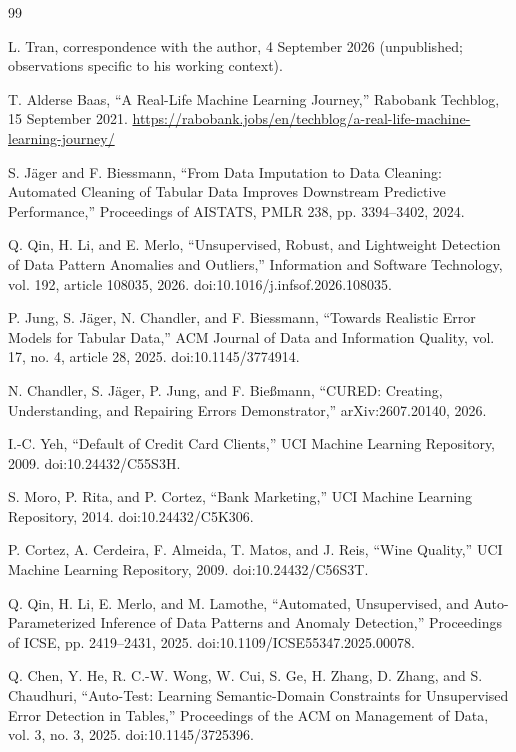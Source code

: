 \documentclass[11pt,a4paper]{article}
\begin{document}
\begin{thebibliography}{99}
\small
\setlength{\itemsep}{2pt}
\setlength{\parskip}{0pt}

 L. Tran, correspondence with the author, 4 September 2026 (unpublished; observations specific to his working context).

 T. Alderse Baas, ``A Real-Life Machine Learning Journey,'' Rabobank Techblog, 15 September 2021. \url{https://rabobank.jobs/en/techblog/a-real-life-machine-learning-journey/}

 S. J\"ager and F. Biessmann, ``From Data Imputation to Data Cleaning: Automated Cleaning of Tabular Data Improves Downstream Predictive Performance,'' Proceedings of AISTATS, PMLR 238, pp. 3394--3402, 2024.

 Q. Qin, H. Li, and E. Merlo, ``Unsupervised, Robust, and Lightweight Detection of Data Pattern Anomalies and Outliers,'' Information and Software Technology, vol. 192, article 108035, 2026. doi:10.1016/j.infsof.2026.108035.

 P. Jung, S. J\"ager, N. Chandler, and F. Biessmann, ``Towards Realistic Error Models for Tabular Data,'' ACM Journal of Data and Information Quality, vol. 17, no. 4, article 28, 2025. doi:10.1145/3774914.

 N. Chandler, S. J\"ager, P. Jung, and F. Bie{\ss}mann, ``CURED: Creating, Understanding, and Repairing Errors Demonstrator,'' arXiv:2607.20140, 2026.

 I.-C. Yeh, ``Default of Credit Card Clients,'' UCI Machine Learning Repository, 2009. doi:10.24432/C55S3H.

 S. Moro, P. Rita, and P. Cortez, ``Bank Marketing,'' UCI Machine Learning Repository, 2014. doi:10.24432/C5K306.

 P. Cortez, A. Cerdeira, F. Almeida, T. Matos, and J. Reis, ``Wine Quality,'' UCI Machine Learning Repository, 2009. doi:10.24432/C56S3T.

 Q. Qin, H. Li, E. Merlo, and M. Lamothe, ``Automated, Unsupervised, and Auto-Parameterized Inference of Data Patterns and Anomaly Detection,'' Proceedings of ICSE, pp. 2419--2431, 2025. doi:10.1109/ICSE55347.2025.00078.

 Q. Chen, Y. He, R. C.-W. Wong, W. Cui, S. Ge, H. Zhang, D. Zhang, and S. Chaudhuri, ``Auto-Test: Learning Semantic-Domain Constraints for Unsupervised Error Detection in Tables,'' Proceedings of the ACM on Management of Data, vol. 3, no. 3, 2025. doi:10.1145/3725396.


\end{thebibliography}
\end{document}
